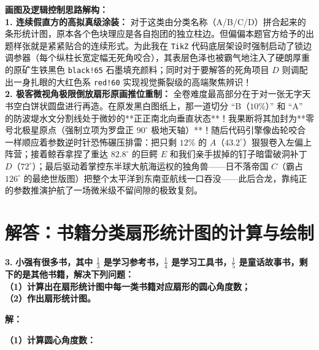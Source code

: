 \vspace{0.6cm}

{\small\color{blue!70!black}
\textbf{画图及逻辑控制思路解构：}\\
\textbf{1. 连续假直方的高拟真级涂装：} 对于这类由分类名称（A/B/C/D）拼合起来的条形统计图，原本各个色块理应是各自抱团的独立柱边。但偏偏本题官方给予的出题样张就是紧紧贴合的连续形式。为此我在 \texttt{TikZ} 代码底层架设时强制启动了锁边调参器（每个纵柱长宽定幅无死角咬合），其表层色泽也被霸气地注入了硬朗厚重的原矿生铁黑色 \texttt{black!65} 石墨填充颜料；同时对于要解答的死角项目 $D$ 则调配出一身扎眼的大红色系 \texttt{red!60} 实现视觉撕裂级的高端聚焦辨识！\\
\textbf{2. 极客微视角极限倒放扇形原画推位重制：} 全卷难度最高部分在于对一张无字天书空白饼状圆盘进行再造。在原发黑白图纸上，那一道切分 “B（$10\%$）” 和 “A” 的防波堤水文分割线处于微妙的**正正南北向垂直状态**！我果断将其加封为**零号北极星原点（强制立项为罗盘正 $90^\circ$ 极地天轴）**！随后代码引擎像齿轮咬合一样顺应着参数逆时针恐怖碾压排雷：把只剩 $12\%$ 的 $A$（$43.2^\circ$）狠狠卷入左偏上阵营；接着鲸吞拿捏了重达 $82.8^\circ$ 的巨鳄 $E$ 和我们亲手拔掉的钉子暗雷破洞补丁 $D$（$72^\circ$）；最后驱动着掌控东半球大航海运权的独角兽——日不落帝国 $C$（霸占 $126^\circ$ 的最绝世版图）把整个太平洋到东南亚航线一口吞没——此后合龙，靠纯正的参数推演护航了一场微米级不留间隙的极致复刻。
}

\newpage



\section{解答：书籍分类扇形统计图的计算与绘制}

\vspace{0.6cm}

\textbf{\LARGE 3.} \textbf{小强有很多书，其中 $\frac{1}{3}$ 是学习参考书，$\frac{1}{4}$ 是学习工具书，$\frac{1}{5}$ 是童话故事书，剩下的是其他书籍，解决下列问题：\\
（1）计算出在扇形统计图中每一类书籍对应扇形的圆心角度数；\\
（2）作出扇形统计图。}

\vspace{0.4cm}
\textbf{解：}

\textbf{（1）计算圆心角度数：}


